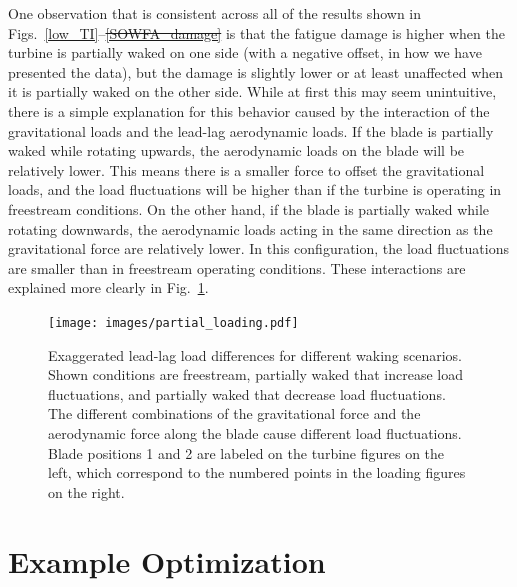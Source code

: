 \documentclass[11pt,letterpaper]{article}
\providecommand{\DIFadd}[1]{{\protect\color{blue}\uwave{#1}}} %
\providecommand{\DIFdel}[1]{{\protect\color{red}\sout{#1}}}                      %
\providecommand{\DIFaddbegin}{} %
\providecommand{\DIFaddend}{} %
\providecommand{\DIFdelbegin}{} %
\providecommand{\DIFdelend}{} %
\newcommand{\DIFscaledelfig}{0.5}
\newlength{\DIFdelgraphicswidth} %
\newlength{\DIFdelgraphicsheight} %
\newcommand{\DIFaddincludegraphics}[2][]{{\color{blue}\fbox{\DIFOincludegraphics[#1]{#2}}}} %
\newcommand{\DIFdelincludegraphics}[2][]{%
\sbox{\DIFdelgraphicsbox}{\DIFOincludegraphics[#1]{#2}}%
\settoboxwidth{\DIFdelgraphicswidth}{\DIFdelgraphicsbox} %
\settoboxtotalheight{\DIFdelgraphicsheight}{\DIFdelgraphicsbox} %
\scalebox{\DIFscaledelfig}{%
\parbox[b]{\DIFdelgraphicswidth}{\usebox{\DIFdelgraphicsbox}\\[-\baselineskip] \rule{\DIFdelgraphicswidth}{0em}}\llap{\resizebox{\DIFdelgraphicswidth}{\DIFdelgraphicsheight}{%
\setlength{\unitlength}{\DIFdelgraphicswidth}%
\begin{picture}(1,1)%
\thicklines\linethickness{2pt} %
{\color[rgb]{1,0,0}\put(0,0){\framebox(1,1){}}}%
{\color[rgb]{1,0,0}\put(0,0){\line( 1,1){1}}}%
{\color[rgb]{1,0,0}\put(0,1){\line(1,-1){1}}}%
\end{picture}%
}\hspace*{3pt}}} %
} %
\DeclareRobustCommand{\DIFaddbegin}{\DIFOaddbegin \let\includegraphics\DIFaddincludegraphics} %
\DeclareRobustCommand{\DIFaddend}{\DIFOaddend \let\includegraphics\DIFOincludegraphics} %
\DeclareRobustCommand{\DIFdelbegin}{\DIFOdelbegin \let\includegraphics\DIFdelincludegraphics} %
\DeclareRobustCommand{\DIFdelend}{\DIFOaddend \let\includegraphics\DIFOincludegraphics} %
\begin{document}
One observation that is consistent across all of the results shown in Figs.~\ref{low_TI}--\DIFdelbegin \DIFdel{\ref{SOWFA_damage} }\DIFdelend \DIFaddbegin \DIFadd{\ref{high_TI} }\DIFaddend is that the fatigue damage is higher when the turbine is partially waked on one side (with a negative offset, in how we have presented the data), but the damage is slightly lower or at least unaffected when it is partially waked on the other side. While at first this may seem unintuitive, there is a simple explanation for this behavior caused by the interaction of the gravitational loads and the lead-lag aerodynamic loads. If the blade is partially waked while rotating upwards, the aerodynamic loads on the blade will be relatively lower. This means there is a smaller force to offset the gravitational loads, and the load fluctuations will be higher than if the turbine is operating in freestream conditions. On the other hand, if the blade is partially waked while rotating downwards, the aerodynamic loads acting in the same direction as the gravitational force are relatively lower. In this configuration, the load fluctuations are smaller than in freestream operating conditions. These interactions are explained more clearly in Fig.~\ref{partial_loading}.
% 
\begin{figure}
    \centering
    \texttt{[image: images/partial\_loading.pdf]}
    \caption{Exaggerated lead-lag load differences for different waking scenarios. Shown conditions are freestream, partially waked that increase load fluctuations, and partially waked that decrease load fluctuations. The different combinations of the gravitational force and the aerodynamic force along the blade cause different load fluctuations. Blade positions 1 and 2 are labeled on the turbine figures on the left, which correspond to the numbered points in the loading figures on the right. }
    \label{partial_loading}
\end{figure}

\section{Example Optimization}
\end{document}
